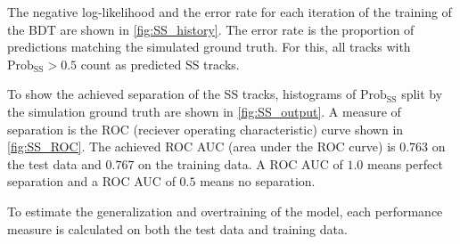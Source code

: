 The negative log-likelihood and the error rate for each iteration of the training of the BDT are shown in \autoref{fig:SS_history}.
The error rate is the proportion of predictions matching the simulated ground truth.
For this, all tracks with $\text{Prob}_\text{SS}>0.5$ count as predicted SS tracks. 

To show the achieved separation of the SS tracks, histograms of $\text{Prob}_\text{SS}$ split by the simulation ground truth are shown in \autoref{fig:SS_output}.
A measure of separation is the ROC (reciever operating characteristic) curve shown in \autoref{fig:SS_ROC}.
The achieved ROC AUC (area under the ROC curve) is $0.763$ on the test data and $0.767$ on the training data.
A ROC AUC of $1.0$ means perfect separation and a ROC AUC of $0.5$ means no separation.

To estimate the generalization and overtraining of the model, each performance measure is calculated on both the test data and training data.

